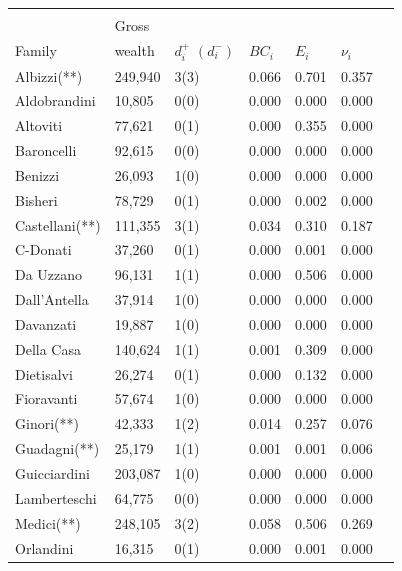 \begin{subappendices}
\begin{table}
\begin{center}
\begin{tabu} to \textwidth {X[l]  X[r]  X[c]  X[c]  X[c]	X[c]  X[c]}
\\[-1.8ex]\hline
\hline \\[-1.8ex]
          & Gross  &  &  &  & \\
Family 			    & wealth & $d^+_i$ $\left(d^-_i\right)$   	&  $BC_i$		&  $E_i$		&  $\nu_i$        \\ \hline
Albizzi(**)     & 249,940 & 3(3) & 0.066 & 0.701 & 0.357      \\
Aldobrandini    & 10,805  & 0(0) & 0.000 & 0.000 & 0.000      \\
Altoviti        & 77,621  & 0(1) & 0.000 & 0.355 & 0.000      \\
Baroncelli      & 92,615  & 0(0) & 0.000 & 0.000 & 0.000      \\
Benizzi         & 26,093  & 1(0) & 0.000 & 0.000 & 0.000      \\
Bisheri         & 78,729  & 0(1) & 0.000 & 0.002 & 0.000      \\
Castellani(**)  & 111,355 & 3(1) & 0.034 & 0.310 & 0.187      \\
C-Donati        & 37,260  & 0(1) & 0.000 & 0.001 & 0.000      \\
Da Uzzano       & 96,131  & 1(1) & 0.000 & 0.506 & 0.000      \\
Dall'Antella    & 37,914  & 1(0) & 0.000 & 0.000 & 0.000      \\
Davanzati       & 19,887  & 1(0) & 0.000 & 0.000 & 0.000      \\
Della Casa      & 140,624 & 1(1) & 0.001 & 0.309 & 0.000      \\
Dietisalvi      & 26,274  & 0(1) & 0.000 & 0.132 & 0.000      \\
Fioravanti      & 57,674  & 1(0) & 0.000 & 0.000 & 0.000      \\
Ginori(**)      & 42,333  & 1(2) & 0.014 & 0.257 & 0.076      \\
Guadagni(**)    & 25,179  & 1(1) & 0.001 & 0.001 & 0.006      \\
Guicciardini    & 203,087 & 1(0) & 0.000 & 0.000 & 0.000      \\
Lamberteschi    & 64,775  & 0(0) & 0.000 & 0.000 & 0.000      \\
Medici(**)      & 248,105 & 3(2) & 0.058 & 0.506 & 0.269      \\
Orlandini       & 16,315  & 0(1) & 0.000 & 0.001 & 0.000      \\

\end{tabu}
\end{center}
\end{table}
\end{subappendices}
